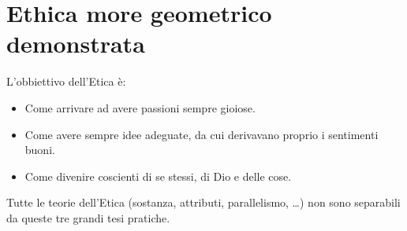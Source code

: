 \chapter*{Ethica more geometrico demonstrata}
L'obbiettivo dell'Etica è:\begin{itemize}
	\item Come arrivare ad avere passioni sempre gioiose.
	\item Come avere sempre idee adeguate, da cui derivavano proprio i sentimenti buoni.
	\item Come divenire coscienti di se stessi, di Dio e delle cose.
\end{itemize}
Tutte le teorie dell'Etica (sostanza, attributi, parallelismo, \dots) non sono separabili da queste tre grandi tesi pratiche.